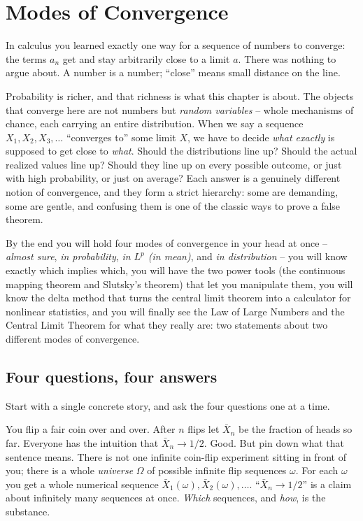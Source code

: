 \chapter{Modes of Convergence}

In calculus you learned exactly one way for a sequence of numbers to converge: the
terms $a_n$ get and stay arbitrarily close to a limit $a$. There was nothing to
argue about. A number is a number; ``close'' means small distance on the line.

Probability is richer, and that richness is what this chapter is about. The
objects that converge here are not numbers but \emph{random variables} -- whole
mechanisms of chance, each carrying an entire distribution. When we say a sequence
$X_1, X_2, X_3, \dots$ ``converges to'' some limit $X$, we have to decide \emph{what
exactly} is supposed to get close to \emph{what}. Should the distributions line up?
Should the actual realized values line up? Should they line up on every possible
outcome, or just with high probability, or just on average? Each answer is a genuinely
different notion of convergence, and they form a strict hierarchy: some are demanding,
some are gentle, and confusing them is one of the classic ways to prove a false
theorem.

By the end you will hold four modes of convergence in your head at once --
\emph{almost sure}, \emph{in probability}, \emph{in $L^p$ (in mean)}, and \emph{in
distribution} -- you will know exactly which implies which, you will have the two
power tools (the continuous mapping theorem and Slutsky's theorem) that let you
manipulate them, you will know the delta method that turns the central limit theorem
into a calculator for nonlinear statistics, and you will finally see the Law of Large
Numbers and the Central Limit Theorem for what they really are: two statements about
two different modes of convergence.

\chapterline

\section{Four questions, four answers}
\label{ch22:four}

Start with a single concrete story, and ask the four questions one at a time.

\begin{intuitionbox}
You flip a fair coin over and over. After $n$ flips let $\bar X_n$ be the fraction of
heads so far. Everyone has the intuition that $\bar X_n \to 1/2$. Good. But pin down
what that sentence means. There is not one infinite coin-flip experiment sitting in
front of you; there is a whole \emph{universe} $\Omega$ of possible infinite flip
sequences $\omega$. For each $\omega$ you get a whole numerical sequence
$\bar X_1(\omega), \bar X_2(\omega), \dots$. ``$\bar X_n \to 1/2$'' is a claim about
infinitely many sequences at once. \emph{Which} sequences, and \emph{how}, is the
substance.
\end{intuitionbox}

